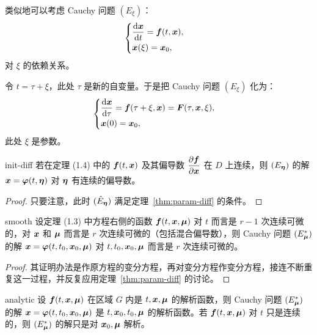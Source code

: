 \medskip
类似地可以考虑 Cauchy 问题 $(E_\xi)$：
\[
	\begin{cases}
		\dfrac{\mathrm{d} \boldsymbol{x}}{\mathrm{d} t} = \boldsymbol{f}(t, \boldsymbol{x}), \\[4pt]
		\boldsymbol{x}(\xi) = \boldsymbol{x}_0,
	\end{cases}
\]
对 $\xi$ 的依赖关系。

令 $t = \tau + \xi$，此处 $\tau$ 是新的自变量。于是把 Cauchy 问题 $(E_\xi)$ 化为：
\[
	\begin{cases}
		\dfrac{\mathrm{d} \boldsymbol{x}}{\mathrm{d} \tau} = \boldsymbol{f}(\tau + \xi, \boldsymbol{x}) = \boldsymbol{F}(\tau, \boldsymbol{x}, \xi), \\[4pt]
		\boldsymbol{x}(0) = \boldsymbol{x}_0,
	\end{cases}
\]
此处 $\xi$ 是参数。

\begin{theorem}{}{init-diff}
	若在定理 (1.4) 中的 $\boldsymbol{f}(t, \boldsymbol{x})$ 及其偏导数 $\dfrac{\partial \boldsymbol{f}}{\partial \boldsymbol{x}}$ 在 $D$ 上连续，则 $(E_{\boldsymbol{\eta}})$ 的解 $\boldsymbol{x} = \boldsymbol{\varphi}(t, \boldsymbol{\eta})$ 对 $\boldsymbol{\eta}$ 有连续的偏导数。
\end{theorem}

\begin{proof}
	只要注意，此时 $(\hat{E}_{\boldsymbol{\eta}})$ 满足定理~\ref{thm:param-diff} 的条件。
\end{proof}

\begin{theorem}{}{smooth}
	设定理 (1.3) 中方程右侧的函数 $\boldsymbol{f}(t, \boldsymbol{x}, \boldsymbol{\mu})$ 对 $t$ 而言是 $r - 1$ 次连续可微的，对 $\boldsymbol{x}$ 和 $\boldsymbol{\mu}$ 而言是 $r$ 次连续可微的（包括混合偏导数），则 Cauchy 问题 $(E_{\boldsymbol{\mu}}^*)$ 的解 $\boldsymbol{x} = \boldsymbol{\varphi}(t, t_0, \boldsymbol{x}_0, \boldsymbol{\mu})$ 对 $t, t_0, \boldsymbol{x}_0, \boldsymbol{\mu}$ 而言是 $r$ 次连续可微的。
\end{theorem}

\begin{proof}
	其证明办法是作原方程的变分方程，再对变分方程作变分方程，接连不断重复这一过程，并反复应用定理~\ref{thm:param-diff} 的讨论。
\end{proof}

\begin{theorem}{}{analytic}
	设 $\boldsymbol{f}(t, \boldsymbol{x}, \boldsymbol{\mu})$ 在区域 $G$ 内是 $t, \boldsymbol{x}, \boldsymbol{\mu}$ 的解析函数，则 Cauchy 问题 $(E_{\boldsymbol{\mu}}^*)$ 的解 $\boldsymbol{x} = \boldsymbol{\varphi}(t, t_0, \boldsymbol{x}_0, \boldsymbol{\mu})$ 是 $t, \boldsymbol{x}_0, t_0, \boldsymbol{\mu}$ 的解析函数。若 $\boldsymbol{f}(t, \boldsymbol{x}, \boldsymbol{\mu})$ 对 $t$ 只是连续的，则 $(E_{\boldsymbol{\mu}}^*)$ 的解只是对 $\boldsymbol{x}_0, \boldsymbol{\mu}$ 解析。
\end{theorem}

